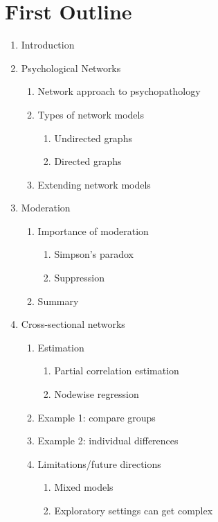\chapter{First Outline}
\begin{enumerate}
    \item Introduction
    \item Psychological Networks
    \begin{enumerate}
        \item Network approach to psychopathology
        \item Types of network models
        \begin{enumerate}
            \item Undirected graphs
            \item Directed graphs
        \end{enumerate}
        \item Extending network models
    \end{enumerate}
    \item Moderation
    \begin{enumerate}
        \item Importance of moderation
        \begin{enumerate}
            \item Simpson's paradox
            \item Suppression
        \end{enumerate}
        \item Summary
    \end{enumerate}
    \item Cross-sectional networks
    \begin{enumerate}
        \item Estimation
        \begin{enumerate}
            \item Partial correlation estimation
            \item Nodewise regression
        \end{enumerate}
        \item Example 1: compare groups
        \item Example 2: individual differences
        \item Limitations/future directions
        \begin{enumerate}
            \item Mixed models
            \item Exploratory settings can get complex

\end{enumerate}
\end{enumerate}
\end{enumerate}
